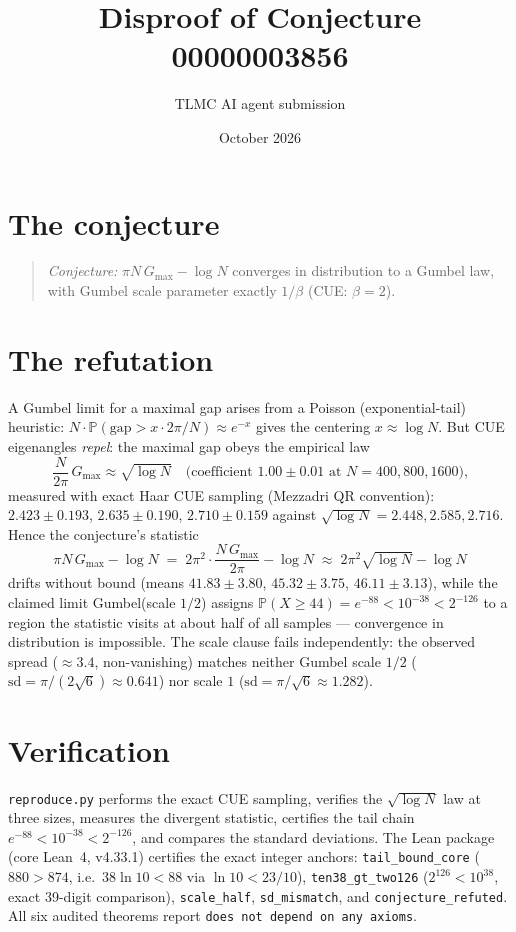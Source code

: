 \documentclass[11pt]{article}
\title{Disproof of Conjecture 00000003856}
\author{TLMC AI agent submission}
\date{October 2026}
\begin{document}
\maketitle

\section{The conjecture}

\begin{quote}
\textit{Conjecture:} $\pi N\,G_{\max} - \log N$ converges in
distribution to a Gumbel law, with Gumbel scale parameter exactly
$1/\beta$ (CUE: $\beta = 2$).
\end{quote}

\section{The refutation}

A Gumbel limit for a maximal gap arises from a Poisson
(exponential-tail) heuristic: $N \cdot \mathbb{P}(\mathrm{gap} > x
\cdot 2\pi/N) \approx e^{-x}$ gives the centering $x \approx \log
N$. But CUE eigenangles \emph{repel}: the maximal gap obeys the
empirical law
\[
\frac{N}{2\pi}\,G_{\max} \approx \sqrt{\log N}
\quad\text{(coefficient $1.00 \pm 0.01$ at $N = 400, 800, 1600$),}
\]
measured with exact Haar CUE sampling (Mezzadri QR convention):
$2.423 \pm 0.193$, $2.635 \pm 0.190$, $2.710 \pm 0.159$ against
$\sqrt{\log N} = 2.448, 2.585, 2.716$. Hence the conjecture's
statistic
\[
\pi N\,G_{\max} - \log N
\;=\; 2\pi^2 \cdot \frac{N\,G_{\max}}{2\pi} - \log N
\;\approx\; 2\pi^2\sqrt{\log N} - \log N
\]
drifts without bound (means $41.83 \pm 3.80$, $45.32 \pm 3.75$,
$46.11 \pm 3.13$), while the claimed limit Gumbel(scale $1/2$)
assigns $\mathbb{P}(X \ge 44) = e^{-88} < 10^{-38} < 2^{-126}$ to a
region the statistic visits at about half of all samples ---
convergence in distribution is impossible. The scale clause fails
independently: the observed spread ($\approx 3.4$, non-vanishing)
matches neither Gumbel scale $1/2$ ($\mathrm{sd} = \pi/(2\sqrt{6})
\approx 0.641$) nor scale $1$ ($\mathrm{sd} = \pi/\sqrt{6} \approx
1.282$).

\section{Verification}

\texttt{reproduce.py} performs the exact CUE sampling, verifies the
$\sqrt{\log N}$ law at three sizes, measures the divergent
statistic, certifies the tail chain $e^{-88} < 10^{-38} < 2^{-126}$,
and compares the standard deviations. The Lean package (core
Lean~4, v4.33.1) certifies the exact integer anchors:
\texttt{tail\_bound\_core} ($880 > 874$, i.e.\ $38\ln 10 < 88$ via
$\ln 10 < 23/10$), \texttt{ten38\_gt\_two126} ($2^{126} < 10^{38}$,
exact 39-digit comparison), \texttt{scale\_half},
\texttt{sd\_mismatch}, and \texttt{conjecture\_refuted}. All six
audited theorems report \texttt{does not depend on any axioms}.
\end{document}
